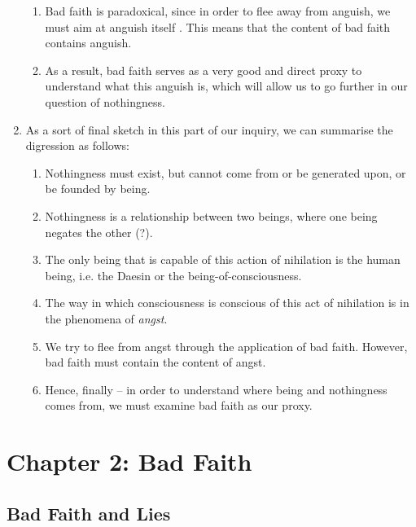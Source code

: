 \begin{enumerate}
  \begin{enumerate}
    \item Bad faith is paradoxical, since in order to flee away from anguish, we must aim at anguish itself \autocite[86]{sartre}. This means that the content of bad faith contains anguish.
    \item As a result, bad faith serves as a very good and direct proxy to understand what this anguish is, which will allow us to go further in our question of nothingness.
  \end{enumerate}
  \item As a sort of final sketch in this part of our inquiry, we can summarise the digression as follows:
  \begin{enumerate}
    \item Nothingness must exist, but cannot come from or be generated upon, or be founded by being.
    \item Nothingness is a relationship between two beings, where one being negates the other (?).
    \item The only being that is capable of this action of nihilation is the human being, i.e. the Daesin or the being-of-consciousness.
    \item The way in which consciousness is conscious of this act of nihilation is in the phenomena of \emph{angst}.
    \item We try to flee from angst through the application of bad faith. However, bad faith must contain the content of angst.
    \item Hence, finally -- in order to understand where being and nothingness comes from, we must examine bad faith as our proxy.
  \end{enumerate}
\end{enumerate}

\section{Chapter 2: Bad Faith}

\subsection{Bad Faith and Lies}

